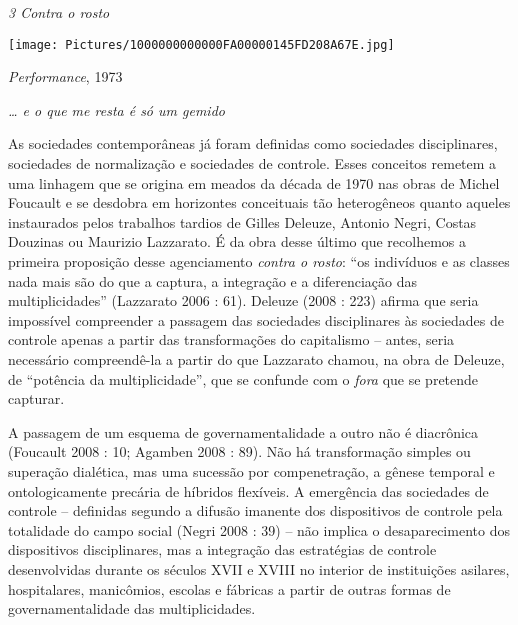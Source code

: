 \emph{3 Contra o rosto}

\texttt{[image: Pictures/1000000000000FA00000145FD208A67E.jpg]}

\emph{Performance}, 1973

\emph{\ldots{} e o que me resta é só um gemido}

As sociedades contemporâneas já foram definidas como sociedades
disciplinares, sociedades de normalização e sociedades de controle.
Esses conceitos remetem a uma linhagem que se origina em meados da
década de 1970 nas obras de Michel Foucault e se desdobra em horizontes
conceituais tão heterogêneos quanto aqueles instaurados pelos trabalhos
tardios de Gilles Deleuze, Antonio Negri, Costas Douzinas ou Maurizio
Lazzarato. É da obra desse último que recolhemos a primeira proposição
desse agenciamento \emph{contra o rosto}: ``os indivíduos e as classes
nada mais são do que a captura, a integração e a diferenciação das
multiplicidades'' (Lazzarato 2006 : 61). Deleuze (2008 : 223) afirma que
seria impossível compreender a passagem das sociedades disciplinares às
sociedades de controle apenas a partir das transformações do capitalismo
-- antes, seria necessário compreendê-la a partir do que Lazzarato
chamou, na obra de Deleuze, de ``potência da multiplicidade'', que se
confunde com o \emph{fora} que se pretende capturar.

A passagem de um esquema de governamentalidade a outro não é diacrônica
(Foucault 2008 : 10; Agamben 2008 : 89). Não há transformação simples ou
superação dialética, mas uma sucessão por compenetração, a gênese
temporal e ontologicamente precária de híbridos flexíveis. A emergência
das sociedades de controle -- definidas segundo a difusão imanente dos
dispositivos de controle pela totalidade do campo social (Negri 2008 :
39) -- não implica o desaparecimento dos dispositivos disciplinares, mas
a integração das estratégias de controle desenvolvidas durante os
séculos XVII e XVIII no interior de instituições asilares, hospitalares,
manicômios, escolas e fábricas a partir de outras formas de
governamentalidade das multiplicidades.

